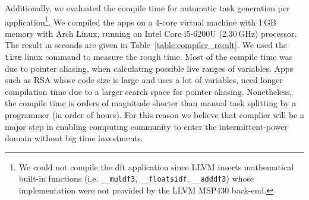 Additionally, we evaluated the compile time for automatic task generation per application\footnote{We could not compile the dft application since LLVM inserts mathematical built-in functions (i.e. \texttt{\_\_muldf3}, \texttt{\_\_floatsidf}, \texttt{\_\_adddf3}) whose implementation were not provided by the LLVM MSP430 back-end.}. We compiled the apps on a 4-core virtual machine with 1\,GB memory with Arch Linux, running on Intel Core i5-6200U (2.30\,GHz) processor. The result in seconds are given in Table~\ref{table:compiler_result}. We used the {\tt time} linux command to measure the rough time. Most of the compile time was due to pointer aliasing, when calculating possible live ranges of variables. Apps such as RSA whose code size is large and uses a lot of variables, need longer compilation time due to a larger search space for pointer aliasing. Nonetheless, the compile time is orders of magnitude shorter than manual task splitting by a programmer (in  order of hours). For this reason we believe that \sys complier will be a major step in enabling computing community to enter the intermittent-power domain without big time investments.

%


